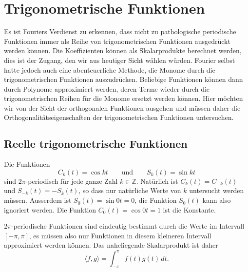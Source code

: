 %
%
%
\section{Trigonometrische Funktionen
\label{buch:orthofkt:section:trigo}}
Es ist Fouriers Verdienst zu erkennen, dass nicht zu pathologische
periodische Funktionen immer als Reihe von trigonometrischen
Funktionen ausgedrückt werden können.
Die Koeffizienten können als Skalarprodukte berechnet werden,
dies ist der Zugang, den wir aus heutiger Sicht wählen würden.
Fourier selbst hatte jedoch auch eine abenteuerliche Methode,
die Monome durch die trigonometrischen Funktionen auszudrücken.
Beliebige Funktionen können dann durch Polynome approximiert
werden, deren Terme wieder durch die trigonometrischen Reihen
für die Monome ersetzt werden können.
Hier möchten wir von der Sicht der orthogonalen Funktionen ausgehen
und müssen daher die Orthogonalitätseigenschaften der trigonometrischen
Funktionen untersuchen.

%
%
\subsection{Reelle trigonometrische Funktionen}
Die Funktionen
\[
C_k(t) = \cos kt
\qquad\text{und}\qquad
S_k(t) = \sin kt
\]
sind $2\pi$-periodisch für jede ganze Zahl $k\in\mathbb{Z}$.
Natürlich ist $C_k(t)=C_{-k}(t)$ und $S_{-k}(t)=-S_k(t)$, so
dass nur natürliche Werte von $k$ untersucht werden müssen.
Ausserdem ist $S_0(t)=\sin 0t=0$,
die Funktion $S_0(t)$ kann also ignoriert werden.
Die Funktion $C_0(t)=\cos 0t=1$ ist die Konstante.

$2\pi$-periodische Funktionen sind eindeutig bestimmt durch die
Werte im Intervall $[-\pi,\pi]$, es müssen also nur Funktionen in
diesem kleineren Intervall approximiert werden können.
Das naheliegende Skalarprodukt ist daher
\[
\langle f,g\rangle
=
\int_{-\pi}^\pi f(t)g(t)\,dt.
\]

%
%
